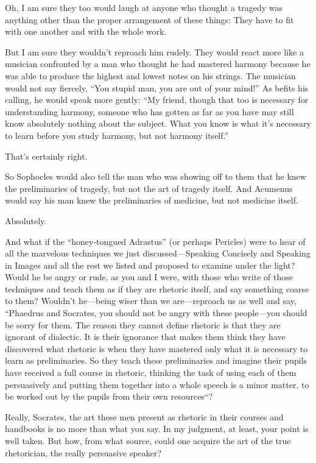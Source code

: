 \sayphaedrus Oh, I am sure they too would laugh at anyone who thought a
tragedy was anything other than the proper arrangement of these things:
They have to fit with one another and with the whole work.

\saysocrates But I am sure they wouldn't reproach him rudely. They would
react more like a musician confronted by a man who thought he had
mastered harmony because he was able to produce the highest and lowest 
notes on his strings. The musician would not say fiercely, “You
stupid man, you are out of your mind!” As befits his calling, he would
speak more gently: “My friend, though that too is necessary for
understanding harmony, someone who has gotten as far as you have may
still know absolutely nothing about the subject. What you know is what
it's necessary to learn before you study harmony, but not harmony
itself.”

\sayphaedrus That's certainly right.

\saysocrates So Sophocles would also tell the man who was showing off 
to them that he knew the preliminaries of tragedy, but
not the art of tragedy itself. And Acumenus would say his man knew the
preliminaries of medicine, but not medicine itself.

\sayphaedrus Absolutely.

\saysocrates And what if the “honey-tongued Adrastus” (or perhaps
Pericles) were to hear
of all the marvelous techniques we just discussed---Speaking Concisely
and Speaking in Images and all the rest we listed and proposed
to examine under the light? Would he be angry or rude, as you and I
were, with those who write of those techniques and teach them as if they
are rhetoric itself, and say something coarse to them? Wouldn't
he---being wiser than we are---reproach us as well and say, “Phaedrus
and Socrates, you should not be angry with these people---you should be
sorry for them. The reason they cannot define rhetoric is that they are
ignorant of dialectic. It is their ignorance that makes them think they
have discovered what rhetoric is when they have mastered only what it is necessary to learn as preliminaries. So they teach these
preliminaries and imagine their pupils have received a full course in
rhetoric, thinking the task of using each of them persuasively and
putting them together into a whole speech is a minor matter, to be
worked out by the pupils from their own resources“?

\sayphaedrus Really, Socrates, the art these men present as rhetoric in
their courses and handbooks is no more than what you say. In my
judgment, at least, your point is well taken. But how, from what
source, could one acquire the art of the true rhetorician, the really
persuasive speaker?

